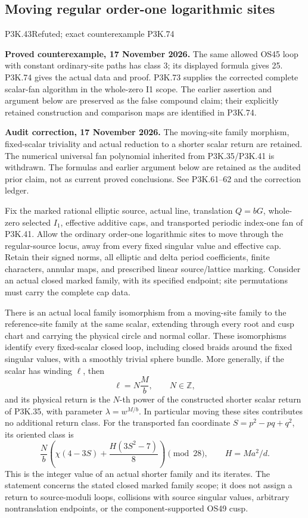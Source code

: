 \subsection{Moving regular order-one logarithmic sites}
\begin{statement}{P3K.43}{Refuted; exact counterexample P3K.74}
\par\noindent\textbf{Proved counterexample, 17 November 2026.} The same allowed OS45 loop with constant ordinary-site paths has class 3; its displayed formula gives 25. P3K.74 gives the actual data and proof. P3K.73 supplies the corrected complete scalar-fan algorithm in the whole-zero I1 scope. The earlier assertion and argument below are preserved as the false compound claim; their explicitly retained construction and comparison maps are identified in P3K.74.

\par\noindent\textbf{Audit correction, 17 November 2026.} The moving-site family morphism, fixed-scalar triviality and actual reduction to a shorter scalar return are retained. The numerical universal fan polynomial inherited from P3K.35/P3K.41 is withdrawn. The formulas and earlier argument below are retained as the audited prior claim, not as current proved conclusions. See P3K.61--62 and the correction ledger.
\medskip


Fix the marked rational elliptic source, actual line, translation
\(Q=bG\), whole-zero selected \(I_1\), effective additive caps,
and transported periodic index-one fan of P3K.41. Allow the ordinary
order-one logarithmic sites to move through the regular-source locus,
away from every fixed singular value and effective cap. Retain their
signed norms, all elliptic and delta period coefficients, finite
characters, annular maps, and prescribed linear source/lattice marking.
Consider an actual closed marked family, with its specified endpoint;
site permutations must carry the complete cap data.

There is an actual local family isomorphism from a moving-site family
to the reference-site family at the same scalar, extending through every
root and cusp chart and carrying the physical circle and normal collar.
These isomorphisms identify every fixed-scalar closed loop, including
closed braids around the fixed singular values, with a smoothly trivial
sphere bundle. More generally, if the scalar has winding \(\ell\),
then
\[
                    \ell=N\frac{M}{b},\qquad N\in\mathbb Z,
\]
and its physical return is the \(N\)-th power of the constructed
shorter scalar return of P3K.35, with parameter
\(\lambda=w^{M/b}\). In particular moving these sites contributes
no additional return class. For the transported fan coordinate
\(S=p^2-pq+q^2\), its oriented class is
\[
 \frac{N}{b}\left(\chi(4-3S)+\frac{H(3S^2-7)}8\right)
             \pmod {28},\qquad H=Ma^2/d.
\]
This is the integer value of an actual shorter family and its iterates.
The statement concerns the stated closed marked family scope; it does
not assign a return to source-moduli loops, collisions with source
singular values, arbitrary nontranslation endpoints, or the
component-supported OS49 cusp.

\end{statement}
